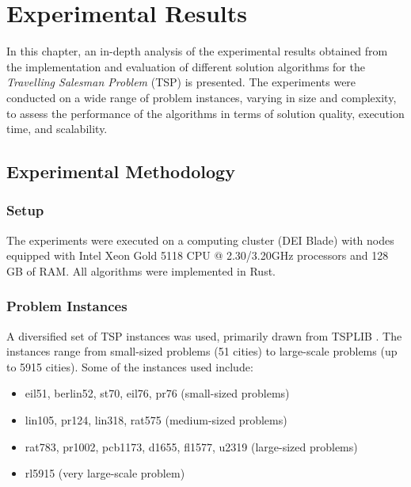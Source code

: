 
%

\chapter{Experimental Results}
\label{chapt:7}

In this chapter, an in-depth analysis of the experimental results obtained from the implementation and evaluation of different solution algorithms for the \textit{Travelling Salesman Problem} (TSP) is presented. The experiments were conducted on a wide range of problem instances, varying in size and complexity, to assess the performance of the algorithms in terms of solution quality, execution time, and scalability.

\section{Experimental Methodology}
\label{sec:metodologia}

\subsection{Setup}
The experiments were executed on a computing cluster (DEI Blade) with nodes equipped with Intel Xeon Gold 5118 CPU @ 2.30/3.20GHz processors and 128 GB of RAM. All algorithms were implemented in Rust.

\subsection{Problem Instances}
A diversified set of TSP instances was used, primarily drawn from TSPLIB \cite{TSPLIB}. The instances range from small-sized problems (51 cities) to large-scale problems (up to 5915 cities). Some of the instances used include:

\begin{itemize}
	\item eil51, berlin52, st70, eil76, pr76 (small-sized problems)
	\item lin105, pr124, lin318, rat575 (medium-sized problems)
	\item rat783, pr1002, pcb1173, d1655, fl1577, u2319 (large-sized problems)
	\item rl5915 (very large-scale problem)
\end{itemize}

